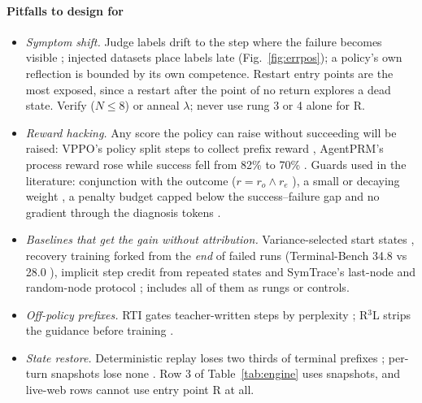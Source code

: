 \documentclass[10pt,a4paper]{article}
\begin{document}
\paragraph{Pitfalls to design for}
\begin{itemize}[leftmargin=1.1em]
\item \emph{Symptom shift.} Judge labels drift to the step where the failure becomes visible \cite{shen2026epv}; injected datasets place labels late (Fig.~\ref{fig:errpos}); a policy's own reflection is bounded by its own competence. Restart entry points are the most exposed, since a restart after the point of no return explores a dead state. Verify ($N\le8$) or anneal $\lambda$; never use rung 3 or 4 alone for R.
\item \emph{Reward hacking.} Any score the policy can raise without succeeding will be raised: VPPO's policy split steps to collect prefix reward \cite{liu2026vppo}, AgentPRM's process reward rose while success fell from 82\% to 70\% \cite{choudhury2025agentprm}. Guards used in the literature: conjunction with the outcome ($r=r_o\wedge r_e$ \cite{tian2026mirl}), a small or decaying weight \cite{agentevolver2025,zhao2026credithurts}, a penalty budget capped below the success--failure gap and no gradient through the diagnosis tokens \cite{zhu2026fault}.
\item \emph{Baselines that get the gain without attribution.} Variance-selected start states \cite{pivotrl2026}, recovery training forked from the \emph{end} of failed runs (Terminal-Bench 34.8 vs 28.0 \cite{reterm2026}), implicit step credit from repeated states \cite{feng2025gigpo} and SymTrace's last-node and random-node protocol \cite{luan2026symtrace};  includes all of them as rungs or controls.
\item \emph{Off-policy prefixes.} RTI gates teacher-written steps by perplexity \cite{chen2026rti}; R$^3$L strips the guidance before training \cite{shi2026r3l}.
\item \emph{State restore.} Deterministic replay loses two thirds of terminal prefixes \cite{tian2026mirl}; per-turn snapshots lose none \cite{liu2026sprout}. Row 3 of Table~\ref{tab:engine} uses snapshots, and live-web rows cannot use entry point R at all.
\end{itemize}
\end{document}
